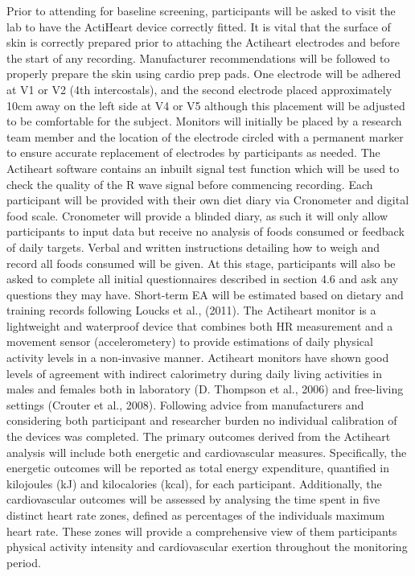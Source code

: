 \documentclass[
]{article}
\begin{document}
Prior to attending for baseline screening, participants will be asked to visit the lab to have the ActiHeart device correctly fitted. It is vital that the surface of skin is correctly prepared prior to attaching the Actiheart electrodes and before the start of any recording. Manufacturer recommendations will be followed to properly prepare the skin using cardio prep pads. One electrode will be adhered at V1 or V2 (4th intercostals), and the second electrode placed approximately 10cm away on the left side at V4 or V5 although this placement will be adjusted to be comfortable for the subject. Monitors will initially be placed by a research team member and the location of the electrode circled with a permanent marker to ensure accurate replacement of electrodes by participants as needed. The Actiheart software contains an inbuilt signal test function which will be used to check the quality of the R wave signal before commencing recording. Each participant will be provided with their own diet diary via Cronometer and digital food scale. Cronometer will provide a blinded diary, as such it will only allow participants to input data but receive no analysis of foods consumed or feedback of daily targets. Verbal and written instructions detailing how to weigh and record all foods consumed will be given. At this stage, participants will also be asked to complete all initial questionnaires described in section 4.6 and ask any questions they may have.
Short-term EA will be estimated based on dietary and training records following Loucks et al., (2011). The Actiheart monitor is a lightweight and waterproof device that combines both HR measurement and a movement sensor (accelerometery) to provide estimations of daily physical activity levels in a non-invasive manner. Actiheart monitors have shown good levels of agreement with indirect calorimetry during daily living activities in males and females both in laboratory (D. Thompson et al., 2006) and free-living settings (Crouter et al., 2008). Following advice from manufacturers and considering both participant and researcher burden no individual calibration of the devices was completed. The primary outcomes derived from the Actiheart analysis will include both energetic and cardiovascular measures. Specifically, the energetic outcomes will be reported as total energy expenditure, quantified in kilojoules (kJ) and kilocalories (kcal), for each participant. Additionally, the cardiovascular outcomes will be assessed by analysing the time spent in five distinct heart rate zones, defined as percentages of the individuals maximum heart rate. These zones will provide a comprehensive view of them participants physical activity intensity and cardiovascular exertion throughout the monitoring period.
\end{document}
